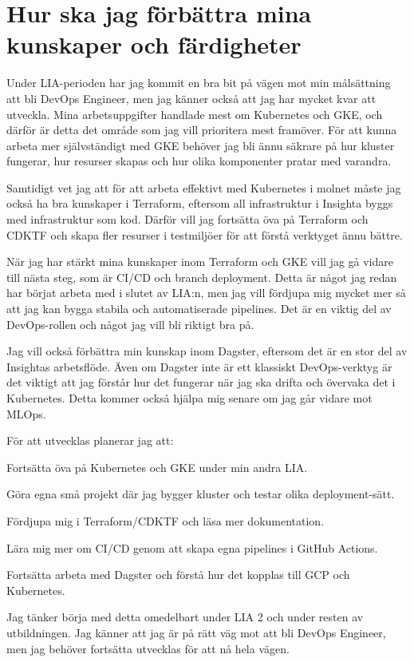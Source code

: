 \section{Hur ska jag förbättra mina kunskaper och färdigheter}
\label{sec:förbättra mind kunskaper och färdigheter} 

Under LIA-perioden har jag kommit en bra bit på vägen mot min målsättning att bli DevOps Engineer, men jag känner också att jag har mycket kvar att utveckla. Mina arbetsuppgifter handlade mest om Kubernetes och GKE, och därför är detta det område som jag vill prioritera mest framöver. För att kunna arbeta mer självständigt med GKE behöver jag bli ännu säkrare på hur kluster fungerar, hur resurser skapas och hur olika komponenter pratar med varandra.

Samtidigt vet jag att för att arbeta effektivt med Kubernetes i molnet måste jag också ha bra kunskaper i Terraform, eftersom all infrastruktur i Insighta byggs med infrastruktur som kod. Därför vill jag fortsätta öva på Terraform och CDKTF och skapa fler resurser i testmiljöer för att förstå verktyget ännu bättre.

När jag har stärkt mina kunskaper inom Terraform och GKE vill jag gå vidare till nästa steg, som är CI/CD och branch deployment. Detta är något jag redan har börjat arbeta med i slutet av LIA:n, men jag vill fördjupa mig mycket mer så att jag kan bygga stabila och automatiserade pipelines. Det är en viktig del av DevOps-rollen och något jag vill bli riktigt bra på.

Jag vill också förbättra min kunskap inom Dagster, eftersom det är en stor del av Insightas arbetsflöde. Även om Dagster inte är ett klassiskt DevOps-verktyg är det viktigt att jag förstår hur det fungerar när jag ska drifta och övervaka det i Kubernetes. Detta kommer också hjälpa mig senare om jag går vidare mot MLOps.

För att utvecklas planerar jag att:

Fortsätta öva på Kubernetes och GKE under min andra LIA.

Göra egna små projekt där jag bygger kluster och testar olika deployment-sätt.

Fördjupa mig i Terraform/CDKTF och läsa mer dokumentation.

Lära mig mer om CI/CD genom att skapa egna pipelines i GitHub Actions.

Fortsätta arbeta med Dagster och förstå hur det kopplas till GCP och Kubernetes.

Jag tänker börja med detta omedelbart under LIA 2 och under resten av utbildningen. Jag känner att jag är på rätt väg mot att bli DevOps Engineer, men jag behöver fortsätta utvecklas för att nå hela vägen.